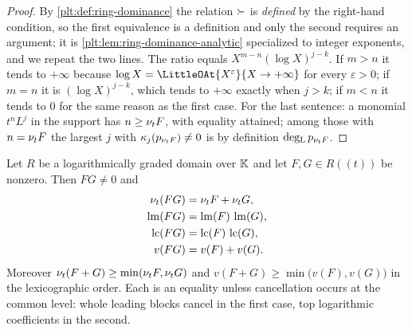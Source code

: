 \begin{proof}
By \cref{plt:def:ring-dominance} the relation $\succ$ is \emph{defined} by
the right-hand condition, so the first equivalence is a definition and only
the second requires an argument; it is
\cref{plt:lem:ring-dominance-analytic} specialized to integer exponents, and
we repeat the two lines.  The ratio equals $X^{m-n}(\log X)^{j-k}$.  If $m>n$
it tends to $+\infty$
because $\log X=\LittleOAt{X^{\varepsilon}}{X\to+\infty}$ for every
$\varepsilon>0$; if $m=n$ it is $(\log X)^{j-k}$, which tends to $+\infty$
exactly when $j>k$; if $m<n$ it tends to $0$ for the same reason as the first
case.  For the last sentence: a monomial $t^nL^j$ in the support has
$n\ge\nu_{t} F$, with equality attained; among those with $n=\nu_{t} F$ the
largest $j$ with $\kappa_j(p_{\nu_{t} F})\ne0$ is by definition
$\operatorname{deg_{L}} p_{\nu_{t} F}$.
\end{proof}

\begin{theorem}
\label{plt:thm:mul-leading-law}
Let $R$ be a logarithmically graded domain over $\mathbb{K}$ and let $F,G\in R((t))$
be nonzero.  Then $FG\ne0$ and
\begin{align}
 \nu_{t}(FG)&=\nu_{t} F+\nu_{t} G,
 \label{plt:eq:mul-ord-additive}\\
 \operatorname{lm}(FG)&=\operatorname{lm}(F)\,\operatorname{lm}(G),
 \label{plt:eq:mul-lm-law}\\
 \operatorname{lc}(FG)&=\operatorname{lc}(F)\,\operatorname{lc}(G),
 \label{plt:eq:mul-lc-law}\\
 v(FG)&=v(F)+v(G).
 \label{plt:eq:mul-v-additive}
\end{align}
Moreover $\nu_{t}(F+G)\ge\min(\nu_{t} F,\nu_{t} G)$ and
$v(F+G)\ge\min\bigl(v(F),v(G)\bigr)$ in the lexicographic order.  Each is an
equality unless cancellation occurs at the common level: whole leading blocks
cancel in the first case, top logarithmic coefficients in the second.
\end{theorem}

